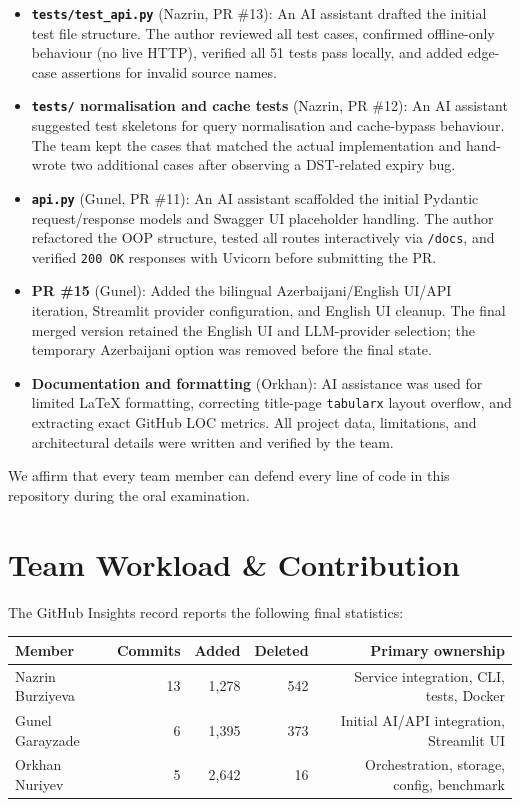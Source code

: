 \documentclass[11pt,a4paper]{article}
\begin{document}
\begin{itemize}
  \item \textbf{\texttt{tests/test\_api.py}} (Nazrin, PR \#13): An AI assistant drafted the initial test file structure. The author reviewed all test cases, confirmed offline-only behaviour (no live HTTP), verified all 51 tests pass locally, and added edge-case assertions for invalid source names.
  \item \textbf{\texttt{tests/} normalisation and cache tests} (Nazrin, PR \#12): An AI assistant suggested test skeletons for query normalisation and cache-bypass behaviour. The team kept the cases that matched the actual implementation and hand-wrote two additional cases after observing a DST-related expiry bug.
  \item \textbf{\texttt{api.py}} (Gunel, PR \#11): An AI assistant scaffolded the initial Pydantic request/response models and Swagger UI placeholder handling. The author refactored the OOP structure, tested all routes interactively via \texttt{/docs}, and verified \texttt{200 OK} responses with Uvicorn before submitting the PR.
  \item \textbf{PR \#15} (Gunel): Added the bilingual Azerbaijani/English UI/API iteration, Streamlit provider configuration, and English UI cleanup. The final merged version retained the English UI and LLM-provider selection; the temporary Azerbaijani option was removed before the final state.
  \item \textbf{Documentation and formatting} (Orkhan): AI assistance was used for limited LaTeX formatting, correcting title-page \texttt{tabularx} layout overflow, and extracting exact GitHub LOC metrics. All project data, limitations, and architectural details were written and verified by the team.
\end{itemize}

We affirm that every team member can defend every line of code in this repository during the oral examination.

\section{Team Workload \& Contribution}\label{sec:contribution}

The GitHub Insights record reports the following final statistics:

\begin{center}\small
\begin{tabular}{lrrrr}
\toprule
\textbf{Member} & \textbf{Commits} & \textbf{Added} & \textbf{Deleted} & \textbf{Primary ownership} \\
\midrule
Nazrin Burziyeva & 13 & 1,278 & 542 & Service integration, CLI, tests, Docker \\
Gunel Garayzade & 6 & 1,395 & 373 & Initial AI/API integration, Streamlit UI \\
Orkhan Nuriyev & 5 & 2,642 & 16 & Orchestration, storage, config, benchmark \\
\bottomrule
\end{tabular}
\end{center}
\end{document}
